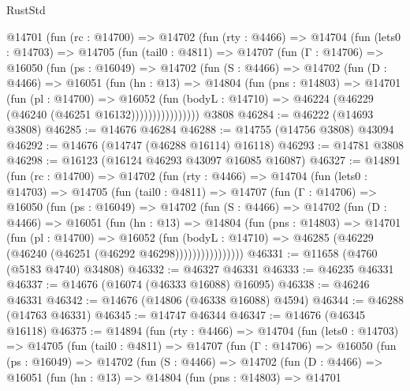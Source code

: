 \begin{lexlean}{RustStd}
\begin{coremodule}
    @14701
      (fun (rc : @14700) =>
      @14702
        (fun (rty : @4466) =>
        @14704
          (fun (lets0 : @14703) =>
          @14705
            (fun (tail0 : @4811) =>
            @14707
              (fun (Γ : @14706) =>
              @16050
                (fun (ps : @16049) =>
                @14702
                  (fun (S : @4466) =>
                  @14702
                    (fun (D : @4466) =>
                    @16051
                      (fun (hn : @13) =>
                      @14804
                        (fun (pns : @14803) =>
                        @14701
                          (fun (pl : @14700) =>
                          @16052
                            (fun (bodyL : @14710) =>
                            @46224 (@46229 (@46240 (@46251 @16132))))))))))))))))
    @3808
@46284 := @46222 (@14693 @3808)
@46285 := @14676 @46284
@46288 := @14755 (@14756 @3808) @43094
@46292 := @14676 (@14747 (@46288 @16114) @16118)
@46293 := @14781 @3808
@46298 := @16123 (@16124 @46293 @43097 @16085 @16087)
@46327 := @14891
    (fun (rc : @14700) =>
    @14702
      (fun (rty : @4466) =>
      @14704
        (fun (lets0 : @14703) =>
        @14705
          (fun (tail0 : @4811) =>
          @14707
            (fun (Γ : @14706) =>
            @16050
              (fun (ps : @16049) =>
              @14702
                (fun (S : @4466) =>
                @14702
                  (fun (D : @4466) =>
                  @16051
                    (fun (hn : @13) =>
                    @14804
                      (fun (pns : @14803) =>
                      @14701
                        (fun (pl : @14700) =>
                        @16052
                          (fun (bodyL : @14710) =>
                          @46285 (@46229 (@46240 (@46251 (@46292 @46298))))))))))))))))
@46331 := @11658 (@4760 (@5183 @4740) @34808)
@46332 := @46327 @46331
@46333 := @46235 @46331
@46337 := @14676 (@16074 (@46333 @16088) @16095)
@46338 := @46246 @46331
@46342 := @14676 (@14806 (@46338 @16088) @4594)
@46344 := @46288 (@14763 @46331)
@46345 := @14747 @46344
@46347 := @14676 (@46345 @16118)
@46375 := @14894
    (fun (rty : @4466) =>
    @14704
      (fun (lets0 : @14703) =>
      @14705
        (fun (tail0 : @4811) =>
        @14707
          (fun (Γ : @14706) =>
          @16050
            (fun (ps : @16049) =>
            @14702
              (fun (S : @4466) =>
              @14702
                (fun (D : @4466) =>
                @16051
                  (fun (hn : @13) =>
                  @14804
                    (fun (pns : @14803) =>
                    @14701

\end{coremodule}
\end{lexlean}
